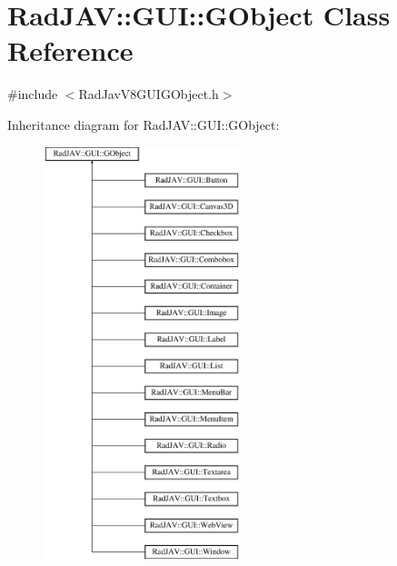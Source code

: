 \hypertarget{class_rad_j_a_v_1_1_g_u_i_1_1_g_object}{}\section{Rad\+J\+AV\+:\+:G\+UI\+:\+:G\+Object Class Reference}
\label{class_rad_j_a_v_1_1_g_u_i_1_1_g_object}


{\ttfamily \#include $<$Rad\+Jav\+V8\+G\+U\+I\+G\+Object.\+h$>$}

Inheritance diagram for Rad\+J\+AV\+:\+:G\+UI\+:\+:G\+Object\+:\begin{figure}[H]
\begin{center}
\leavevmode
\includegraphics[height=12.000000cm]{class_rad_j_a_v_1_1_g_u_i_1_1_g_object}
\end{center}
\end{figure}

